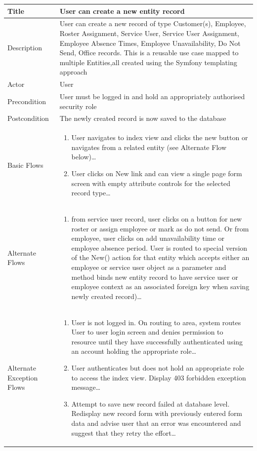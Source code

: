 \documentclass[a4paper,Times New Roman 11pt]{article}
\newcommand\addrow[2]{#1 &#2\\ }
\newcommand\addheading[2]{#1 &#2\\ \hline}
\newcommand\tabularhead{\begin{tabular}{lp{9cm}}
\hline
}
\newcommand\addmulrow[2]{ \begin{minipage}[t][][t]{3cm}#1\end{minipage}%
   &\begin{minipage}[t][][t]{9cm}
    \begin{enumerate} #2   \end{enumerate}
    \end{minipage}\\ }
\newenvironment{usecase}{\tabularhead}
{\hline\end{tabular}}
\begin{document}
\begin{samepage}
\begin{usecase}
    \addheading{Title}{User can create a new entity record }
  \addheading{Description}{User can create a new record of type Customer(s), Employee, Roster Assignment, Service User, Service User Assignment, Employee Absence Times, Employee Unavailability, Do Not Send, Office records. This is a reusable use case mapped to multiple Entities,all created using the Symfony templating approach}
  \addheading{Actor}{User} 
  \addrow{Precondition}{User must be logged in and hold an appropriately authorised security role}
  \addrow{Postcondition}{The newly created record is now saved to the database}
  \addmulrow{Basic Flows}{\item User navigates to index view and clicks the new button or navigates from a related entity (see Alternate Flow below)\ldots
                                  \item User clicks on New link and can view a single page form screen with empty attribute controls for the selected record type\ldots}
  \addmulrow{Alternate  Flows}{\item from service user record, user clicks on a button for new roster or assign employee or mark as do not send. Or from employee, user clicks on add unavailability time or employee absence period. User is routed to special version of the New() action for that entity which accepts either an employee or service user object as a parameter and method binds new entity record to have service user or employee context as an associated foreign key when saving newly created record)\ldots}
  \addmulrow{Alternate Exception Flows}{\item User is not logged in. On routing to area, system routes User to user login screen and denies permission to resource until they have successfully authenticated using an account holding the appropriate role\ldots
                                                                      \item User authenticates but does not hold an appropriate role to access the index view. Display 403 forbidden exception message\ldots
                                                                      \item Attempt to save new record failed at database level. Redisplay new record form with previously entered form data and advise user that an error was encountered and suggest that they retry the effort\ldots}

\end{usecase}


\end{samepage}
\end{document}
